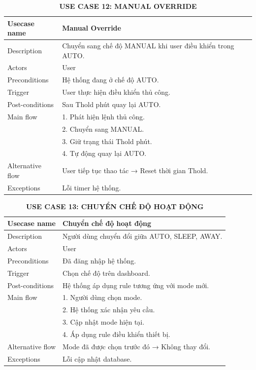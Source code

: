 \begin{table}[H]
\centering
\caption*{\textbf{USE CASE 12: MANUAL OVERRIDE}}
\renewcommand{\arraystretch}{1.3}
\begin{tabular}{|p{4cm}|p{11cm}|}
\hline
Usecase name & Manual Override \\
\hline
Description & Chuyển sang chế độ MANUAL khi user điều khiển trong AUTO. \\
\hline
Actors & User \\
\hline
Preconditions & Hệ thống đang ở chế độ AUTO. \\
\hline
Trigger & User thực hiện điều khiển thủ công. \\
\hline
Post-conditions & Sau Thold phút quay lại AUTO. \\
\hline
Main flow &
1. Phát hiện lệnh thủ công.\\ &
2. Chuyển sang MANUAL.\\ &
3. Giữ trạng thái Thold phút.\\ &
4. Tự động quay lại AUTO. \\
\hline
Alternative flow & User tiếp tục thao tác → Reset thời gian Thold. \\
\hline
Exceptions & Lỗi timer hệ thống. \\
\hline
\end{tabular}
\end{table}
\begin{table}[H]
\centering
\caption*{\textbf{USE CASE 13: CHUYỂN CHẾ ĐỘ HOẠT ĐỘNG}}
\renewcommand{\arraystretch}{1.3}
\begin{tabular}{|p{4cm}|p{11cm}|}
\hline
Usecase name & Chuyển chế độ hoạt động \\
\hline
Description & Người dùng chuyển đổi giữa AUTO, SLEEP, AWAY. \\
\hline
Actors & User \\
\hline
Preconditions & Đã đăng nhập hệ thống. \\
\hline
Trigger & Chọn chế độ trên dashboard. \\
\hline
Post-conditions & Hệ thống áp dụng rule tương ứng với mode mới. \\
\hline
Main flow &
1. Người dùng chọn mode.\\ &
2. Hệ thống xác nhận yêu cầu.\\ &
3. Cập nhật mode hiện tại.\\ &
4. Áp dụng rule điều khiển thiết bị. \\
\hline
Alternative flow & Mode đã được chọn trước đó → Không thay đổi. \\
\hline
Exceptions & Lỗi cập nhật database. \\
\hline
\end{tabular}
\end{table}
